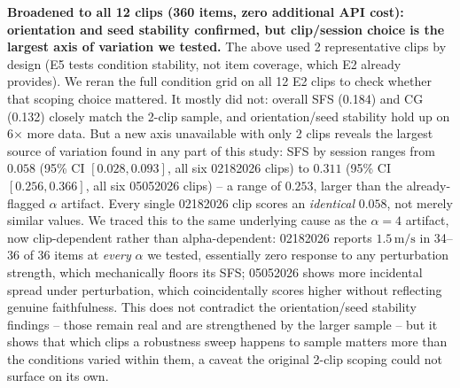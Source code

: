 \documentclass[11pt]{article}
\begin{document}
\noindent\textbf{Broadened to all 12 clips (360 items, zero additional API
cost): orientation and seed stability confirmed, but clip/session choice is
the largest axis of variation we tested.} The above used 2 representative
clips by design (E5 tests condition stability, not item coverage, which E2
already provides). We reran the full condition grid on all 12 E2 clips to
check whether that scoping choice mattered. It mostly did not: overall SFS
(0.184) and CG (0.132) closely match the 2-clip sample, and orientation/seed
stability hold up on 6$\times$ more data. But a new axis unavailable with only
2 clips reveals the largest source of variation found in any part of this
study: SFS by session ranges from $0.058$ (95\% CI $[0.028,0.093]$, all six
02182026 clips) to $0.311$ (95\% CI $[0.256,0.366]$, all six 05052026 clips) --
a range of $0.253$, larger than the already-flagged $\alpha$ artifact. Every
single 02182026 clip scores an \emph{identical} $0.058$, not merely similar
values. We traced this to the same underlying cause as the $\alpha{=}4$
artifact, now clip-dependent rather than alpha-dependent: 02182026 reports
$1.5\,\mathrm{m/s}$ in 34--36 of 36 items at \emph{every} $\alpha$ we tested,
essentially zero response to any perturbation strength, which mechanically
floors its SFS; 05052026 shows more incidental spread under perturbation,
which coincidentally scores higher without reflecting genuine faithfulness.
This does not contradict the orientation/seed stability findings -- those
remain real and are strengthened by the larger sample -- but it shows that
which clips a robustness sweep happens to sample matters more than the
conditions varied within them, a caveat the original 2-clip scoping could not
surface on its own.
\end{document}
